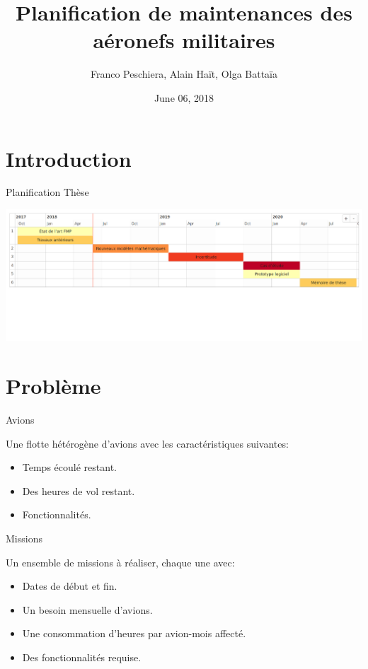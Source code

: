 \documentclass[ignorenonframetext,]{beamer}
\title{Planification de maintenances des aéronefs militaires}
\author{Franco Peschiera, Alain Haït, Olga Battaïa}
\institute{ISAE SUPAERO}
\date{June 06, 2018}
\providecommand{\tightlist}{%
  \setlength{\itemsep}{0pt}\setlength{\parskip}{0pt}}
\begin{document}
\frame{\titlepage}

\begin{frame}
\tableofcontents[hideallsubsections]
\end{frame}

\section{Introduction}\label{introduction}

\begin{frame}{Planification Thèse}

\includegraphics[width=1\linewidth]{./../../img/gantt_thesis}

\end{frame}

\section{Problème}\label{probleme}

\begin{frame}{Avions}

Une flotte hétérogène d'avions avec les caractéristiques suivantes:

\begin{itemize}[<+->]
\tightlist
\item
  Temps écoulé restant.
\item
  Des heures de vol restant.
\item
  Fonctionnalités.
\end{itemize}

\end{frame}

\begin{frame}{Missions}

Un ensemble de missions à réaliser, chaque une avec:

\begin{itemize}[<+->]
\tightlist
\item
  Dates de début et fin.
\item
  Un besoin mensuelle d'avions.
\item
  Une consommation d'heures par avion-mois affecté.
\item
  Des fonctionnalités requise.
\end{itemize}

\end{frame}
\end{document}
